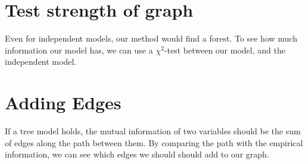 \documentclass[12pt]{article}
\begin{document}
\section{Test strength of graph}
Even for independent models, our method would find a forest. To see how much information our model has, we can use a $\chi ^2$-test between our model, and
the independent model.

\section{Adding Edges}
If a tree model holds, the mutual information of two variables should be the 
sum of edges along the path between them. By comparing the path with the empirical information, we can see which edges we should should add to our graph.
\end{document}
